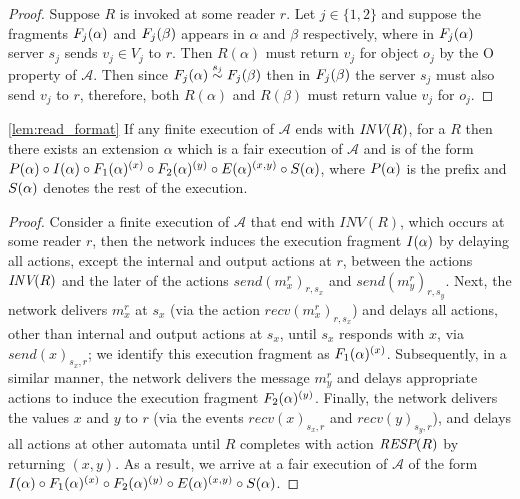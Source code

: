 \begin{proof}
Suppose $R$ is invoked at some reader $r$. Let $j \in \{1, 2\}$ and  suppose the fragments  $\frage{F_{j}}{\alpha}{}$ and  $\frage{F_{j}}{\beta}{}$ 
appears in $\alpha$ and $\beta$ respectively, where in $\frage{F_{j}}{\alpha}{}$ server $s_j$
sends  $v_j \in V_j$ to $r$. Then $R(\alpha)$ must return $v_j$ for object $o_j$ by the O property  of $\mathcal{A}$. Then since $\frage{F_{j}}{\alpha}{} \stackrel{s_j}{\sim} \frage{F_{j}}{\beta}{}$ then
in  $\frage{F_{j}}{\beta}{}$  the server $s_j$ 
must also  send $v_j$ to $r$,  therefore,  both $R(\alpha)$ and $R(\beta)$ must return value $v_j$ for $o_j$.
%
\end{proof}

\begin{lemma*}\ref{lem:read_format}
If any finite execution of  $\mathcal{A}$ ends with ${\textit{INV}(R)}$, for a \rot{} $R$ then there exists an extension $\alpha$ which is a fair execution of $\mathcal{A}$ and  is  of the form  
   $\frage{P}{\alpha}{} \circ\frage{I}{\alpha}{} \circ \frage{F_{1}}{\alpha}{x} \circ \frage{F_{2}}{\alpha}{y} \circ \frage{E}{\alpha}{x, y} \circ \frage{S}{\alpha}{}$, where $\frage{P}{\alpha}{}$ is the prefix and $\frage{S}{\alpha}{}$ denotes the rest of the execution. 
 \end{lemma*}

\begin{proof}
 Consider a finite execution of $\mathcal{A}$  that end with  $INV(R)$, which  occurs at some reader  $r$, 
then the  network  induces the execution fragment $\frage{I}{\alpha}{}$  by delaying all actions, except the internal and output actions at $r$, between 
the actions ${\textit{INV}(R)}$ and the later of the actions $send(m_x^{r})_{r, s_x}$ and $send(m_y^{r})_{r, s_y}$. Next, the network  
delivers $m_x^{r}$ at $s_x$ (via the action $recv(m_x^{r})_{r, s_x}$) and delays all actions, other than internal and output actions at $s_x$, until $s_x$ responds with $x$, via  $send(x)_{s_x, r}$; 
we identify this  execution fragment
 as $\frage{F_{1}}{\alpha}{x}$. Subsequently, in a similar manner, 
the  network  delivers the message  $m_y^{r}$ and delays appropriate actions to induce the execution fragment 
$\frage{F_{2}}{\alpha}{y}$. Finally, the network  delivers the values $x$ and $y$ to $r$ (via the events $recv(x)_{s_x, r}$ and $recv(y)_{s_y, r}$), 
and delays all actions at other automata until $R$ completes  with action ${\textit{RESP}(R)}$ by returning $(x, y)$.  As a result, we  arrive at a fair execution of $\mathcal{A}$ of the form
 $\frage{I}{\alpha}{} \circ \frage{F_{1}}{\alpha}{x} \circ \frage{F_{2}}{\alpha}{y} \circ \frage{E}{\alpha}{x, y} \circ \frage{S}{\alpha}{}$.
\end{proof}




